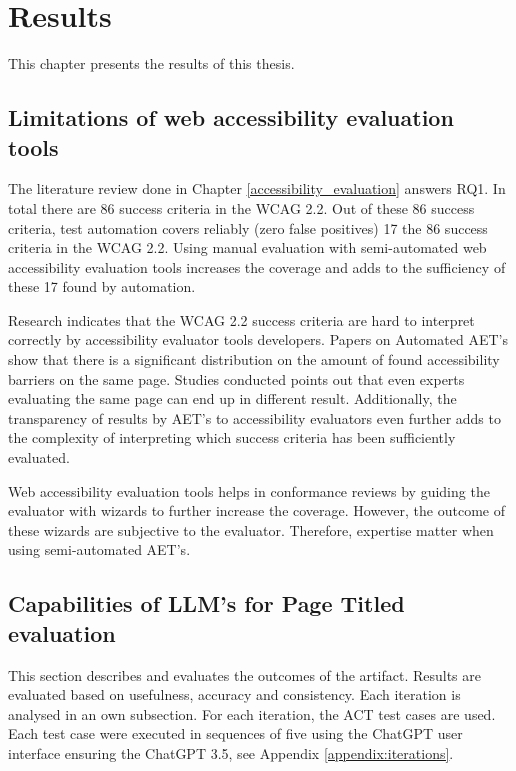 \chapter{Results\label{results}}

This chapter presents the results of this thesis. 

\section{Limitations of web accessibility evaluation tools}

The literature review done in Chapter \ref{accessibility_evaluation} answers RQ1. In total there are 86 success criteria in the WCAG 2.2. Out of these 86 success criteria, test automation covers reliably (zero false positives) 17 the 86 success criteria in the WCAG 2.2. Using manual evaluation with semi-automated web accessibility evaluation tools increases the coverage and adds to the sufficiency of these 17 found by automation.

Research indicates that the WCAG 2.2 success criteria are hard to interpret correctly by accessibility evaluator tools developers. Papers on Automated AET's show that there is a significant distribution on the amount of found accessibility barriers on the same page. Studies conducted points out that even experts evaluating the same page can end up in different result. Additionally, the transparency of results by AET's to accessibility evaluators even further adds to the complexity of interpreting which success criteria has been sufficiently evaluated.

Web accessibility evaluation tools helps in conformance reviews by guiding the evaluator with wizards to further increase the coverage. However, the outcome of these wizards are subjective to the evaluator. Therefore, expertise matter when using semi-automated AET's.

\section{Capabilities of LLM's for Page Titled evaluation}

This section describes and evaluates the outcomes of the artifact. Results are evaluated based on usefulness, accuracy and consistency. Each iteration is analysed in an own subsection. For each iteration, the \textcite{act_rule_g88} ACT test cases are used. Each test case were executed in sequences of five using the ChatGPT user interface ensuring the ChatGPT 3.5, see Appendix \ref{appendix:iterations}.

